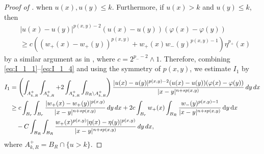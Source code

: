 \documentclass[11pt]{amsart}
\theoremstyle{plain}
\theoremstyle{definition}
\numberwithin{equation}{section}
\renewcommand{\d}{\textnormal{d}}
\begin{document}
\begin{proof} [Proof of ]
when $u(x), u(y) \leq k$. Furthermore, if $u(x) > k$ and $
u(y) \leq k$, then
\begin{equation} \label{eq:I_1_4}
\begin{split}
&|u(x)-u(y)|^{p(x,y)-2}(u(x)-u(y))(\varphi(x) - \varphi(y)) \\
&\geq c \left((w_+(x)-w_+(y))^{p(x,y)} + w_+(x) w_-(y)^{p(x,y)-1} \right) \eta^{p_+}(x)
\end{split}
\end{equation}
by a similar argument as in \cite[Proposition 8.5]{Coz17}, where $c = 2^{p_--2} \land 1$. Therefore, combining \eqref{eq:I_1_1}–\eqref{eq:I_1_4} and using the symmetry of $p(x,y)$, we estimate $I_1$ by
\begin{equation} \label{eq:I_1_Caccioppoli}
\begin{split}
I_1
&= \left( \int_{A_{k,R}^+} \int_{A_{k,R}^+} + 2\int_{A_{k,R}^+} \int_{B_R \setminus A_{k,R}^+} \right) \frac{|u(x)-u(y)|^{p(x,y)-2}(u(x)-u(y))(\varphi(x) - \varphi(y))}{|x-y|^{n+sp(x,y)}} \,\d y \,\d x \\ 
&\geq c \int_{B_r} \int_{B_r} \frac{|w_+(x)-w_+(y)|^{p(x,y)}}{|x-y|^{n+sp(x,y)}} \,\d y \,\d x + 2c \int_{B_r} w_+(x) \int_{B_R} \frac{w_-(y)^{p(x,y)-1}}{|x-y|^{n+sp(x,y)}} \,\mathrm{d}y \,\mathrm{d}x \\
&\quad - C \int_{B_R} \int_{B_R} \frac{w_+(x)^{p(x,y)} |\eta(x)-\eta(y)|^{p(x,y)}}{|x-y|^{n+sp(x,y)}} \,\d y \,\d x,
\end{split}
\end{equation}
where $A_{k,R}^+ = B_R \cap \lbrace u > k \rbrace$.


\end{proof}
\end{document}
